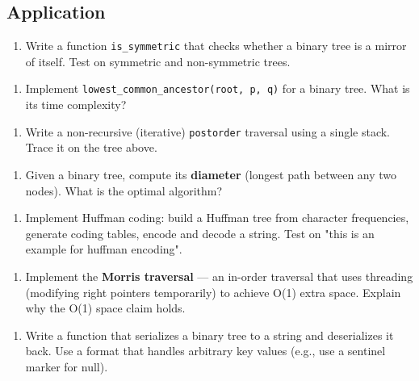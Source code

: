 \subsection{Application}

\begin{enumerate}
\item Write a function \texttt{is\_symmetric} that checks whether a binary tree is a mirror of itself. Test on symmetric and non-symmetric trees.
\end{enumerate}

\begin{enumerate}
\item Implement \texttt{lowest\_common\_ancestor(root, p, q)} for a binary tree. What is its time complexity?
\end{enumerate}

\begin{enumerate}
\item Write a non-recursive (iterative) \texttt{postorder} traversal using a single stack. Trace it on the tree above.
\end{enumerate}

\begin{enumerate}
\item Given a binary tree, compute its \textbf{diameter} (longest path between any two nodes). What is the optimal algorithm?
\end{enumerate}

\begin{enumerate}
\item Implement Huffman coding: build a Huffman tree from character frequencies, generate coding tables, encode and decode a string. Test on "this is an example for huffman encoding".
\end{enumerate}

\begin{enumerate}
\item Implement the \textbf{Morris traversal} — an in-order traversal that uses threading (modifying right pointers temporarily) to achieve O(1) extra space. Explain why the O(1) space claim holds.
\end{enumerate}

\begin{enumerate}
\item Write a function that serializes a binary tree to a string and deserializes it back. Use a format that handles arbitrary key values (e.g., use a sentinel marker for null).
\end{enumerate}

